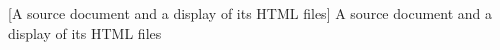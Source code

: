 [A source document and a display of its HTML files]{%
A source document and a display of its HTML files 
}%
